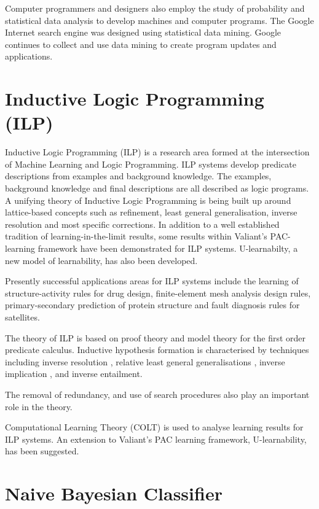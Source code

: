 \documentclass[11pt]{article} %
\begin{document}
Computer programmers and designers also employ the study of probability and statistical data analysis to develop machines and computer programs. The Google Internet search engine was designed using statistical data mining. Google continues to collect and use data mining to create program updates and applications.



\section{Inductive Logic Programming (ILP)}

Inductive Logic Programming (ILP) is a research area formed at the intersection of Machine Learning and Logic Programming. ILP systems develop predicate descriptions from examples and background knowledge. The examples, background knowledge and final descriptions are all described as logic programs. A unifying theory of Inductive Logic Programming is being built up around lattice-based concepts such as refinement, least general generalisation, inverse resolution and most specific corrections. In addition to a well established tradition of learning-in-the-limit results, some results within Valiant's PAC-learning framework have been demonstrated for ILP systems. U-learnabilty, a new model of learnability, has also been developed.


Presently successful applications areas for ILP systems include the learning of structure-activity rules for drug design, finite-element mesh analysis design rules, primary-secondary prediction of protein structure and fault diagnosis rules for satellites.


The theory of ILP is based on proof theory and model theory for the first order predicate calculus. Inductive hypothesis formation is characterised by techniques including inverse resolution , relative least general generalisations , inverse implication , and inverse entailment.


The removal of redundancy, and use of search procedures also play an important role in the theory.


Computational Learning Theory (COLT) is used to analyse learning results for ILP systems. An extension to Valiant's PAC learning framework, U-learnability, has been suggested.



\section{Naive Bayesian Classifier}
\end{document}
